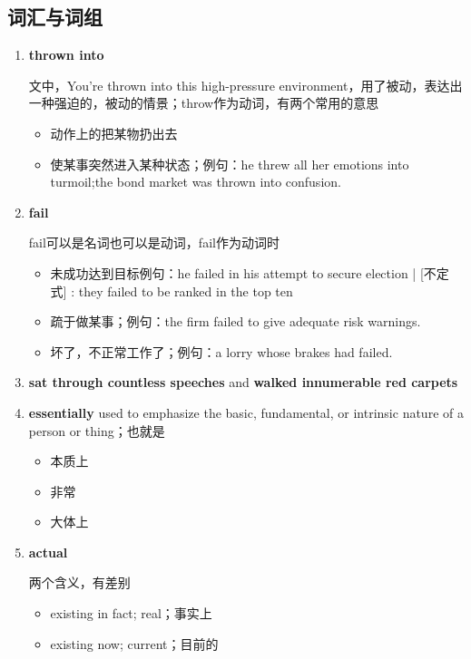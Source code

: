 \documentclass[UTF8]{ctexart}
\begin{document}
\subsection{词汇与词组}
\begin{enumerate}
\item \textbf{thrown into}\label{voc:1}

文中，You’re thrown into this high-pressure environment，用了被动，表达出一种强迫的，被动的情景；throw作为动词，有两个常用的意思

\begin{itemize}
\item 动作上的把某物扔出去
\item 使某事突然进入某种状态；例句：he threw all her emotions into turmoil;the bond market was thrown into confusion.

\end{itemize}



\item \textbf{fail}\label{voc:2}

fail可以是名词也可以是动词，fail作为动词时
\begin{itemize}
\item 未成功达到目标例句：he failed in his attempt to secure election | [不定式] : they failed to be ranked in the top ten
\item 疏于做某事；例句：the firm failed to give adequate risk warnings.
\item 坏了，不正常工作了；例句：a lorry whose brakes had failed.

\end{itemize}

\item \textbf{sat through countless speeches} and \textbf{walked innumerable red carpets}\label{voc:3}

\item \textbf{essentially}\label{voc:4}
used to emphasize the basic, fundamental, or intrinsic nature of a person or thing；也就是
\begin{itemize}
\item 本质上
\item 非常
\item 大体上
\end{itemize}


\item \textbf{actual}\label{voc:5}

两个含义，有差别
\begin{itemize}
\item existing in fact; real；事实上
\item existing now; current；目前的
\end{itemize}


\end{enumerate}
\end{document}
